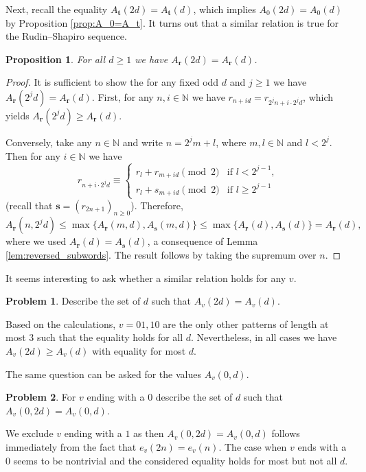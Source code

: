 \documentclass[a4paper,11pt]{amsart}
\newtheorem{prop}[thm]{Proposition}
\theoremstyle{definition}
\newtheorem{prob}{Problem}
\newcommand{\N}{\mathbb{N}}
\begin{document}
Next, recall the equality $A_{\mathbf{t}}(2d) = A_{\mathbf{t}}(d)$, which implies $A_0(2d) = A_0(d)$ by Proposition \ref{prop:A_0=A_t}. It turns out that a similar relation is true for the Rudin--Shapiro sequence.
\begin{prop} \label{prop:d_odd}
For all $d \geq 1$ we have $A_{\mathbf{r}}(2d) = A_{\mathbf{r}}(d)$.
\end{prop}
\begin{proof}
It is sufficient to show the for any fixed odd $d$ and $j \geq 1$ we have $A_{\mathbf{r}}(2^j d) = A_{\mathbf{r}}(d)$. First, for any $n,i \in \N$ we have $r_{n+id} = r_{2^jn + i \cdot 2^jd}$, which yields $A_{\mathbf{r}}(2^j d) \geq A_{\mathbf{r}}(d)$.

Conversely, take any $n \in \N$ and write $n = 2^j m + l$, where $m,l \in \N$ and $l < 2^j$. Then for any $i \in \N$ we have
$$ r_{n+i\cdot 2^jd} \equiv \begin{cases}
r_l + r_{m+id}  \pmod{2}  &\text{if } l < 2^{j-1}, \\
r_l + s_{m+id} \pmod{2}  &\text{if } l \geq 2^{j-1}
\end{cases}    $$
(recall that $\mathbf{s} =  (r_{2n+1})_{n \geq 0}$). Therefore,
$$  A_{\mathbf{r}}(n,2^jd) \leq \max\{A_{\mathbf{r}}(m,d), A_{\mathbf{s}}(m,d)\} \leq \max\{A_{\mathbf{r}}(d), A_{\mathbf{s}}(d)\} = A_{\mathbf{r}}(d),$$
where we used $A_{\mathbf{r}}(d) =  A_{\mathbf{s}}(d)$, a consequence of Lemma \ref{lem:reversed_subwords}. The result follows by taking the supremum over $n$.
\end{proof}

It seems interesting to ask whether a similar relation holds for any $v$.
\begin{prob} \label{prob:odd_d}
Describe the set of $d$ such that $A_v(2d) = A_v(d)$.
\end{prob}

Based on the calculations, $v=01,10$ are the only other patterns of length at most $3$ such that the equality holds for all $d$. Nevertheless, in all cases we have $A_v(2d) \geq A_v(d)$ with equality for most $d$.

The same question can be asked for the values $A_v(0,d)$.
\begin{prob} 
For $v$ ending with a $0$ describe the set of $d$ such that $A_v(0,2d) = A_v(0,d)$.
\end{prob}
We exclude $v$ ending with a $1$ as then $A_v(0,2d) = A_v(0,d)$ follows immediately from the fact that $e_v(2n) =  e_v(n)$. The case when $v$ ends with a $0$ seems to be nontrivial and the considered equality holds for most but not all $d$.
\end{document}
